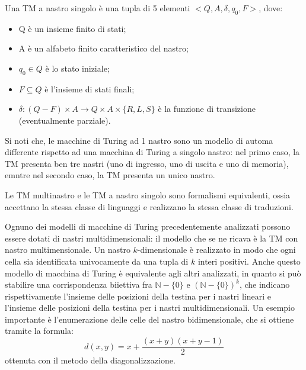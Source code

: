   \begin{definition}
    Una TM a nastro singolo è una tupla di 5 elementi \(<Q,A,\delta, q_0, F>\), dove:
    \begin{itemize}
      \item Q è un insieme finito di stati;
      \item A è un alfabeto finito caratteristico del nastro;
      \item \(q_0 \in Q\) è lo stato iniziale;
      \item \(F\subseteq Q\) è l'insieme di stati finali;
      \item \(\delta:(Q-F)\times A \to Q\times A\times \{R,L,S\}\) è la funzione di transizione (eventualmente parziale).
    \end{itemize}
  \end{definition}

  Si noti che, le macchine di Turing ad 1 nastro sono un modello di automa differente rispetto ad una macchina di Turing a singolo nastro: nel primo caso, la TM presenta ben tre nastri (uno di ingresso, uno di uscita e uno di memoria), emntre nel secondo caso, la TM presenta un unico nastro. 

  \begin{theorem}
    Le TM multinastro e le TM a nastro singolo sono formalismi equivalenti, ossia accettano la stessa classe di linguaggi e realizzano la stessa classe di traduzioni.
  \end{theorem}


  Ognuno dei modelli di macchine di Turing precedentemente analizzati possono essere dotati di nastri multidimensionali: il modello che se ne ricava è la TM con nastro multimensionale. Un nastro \(k\)-dimensionale è realizzato in modo che ogni cella sia identificata univocamente da una tupla di \(k\) interi positivi. Anche questo modello di macchina di Turing è equivalente agli altri analizzati, in quanto si può stabilire una corrispondenza biiettiva fra \(\mathbb N - \{0\}\) e \((\mathbb N - \{0\})^k\), che indicano rispettivamente l'insieme delle posizioni della testina per i nastri lineari e l'insieme delle posizioni della testina per i nastri multidimensionali. Un esempio importante è l'enumerazione delle celle del nastro bidimensionale, che si ottiene tramite la formula:
  \begin{equation*}
    \displaystyle d(x,y) = x+\frac{(x+y)(x+y-1)}{2}
  \end{equation*}
  ottenuta con il metodo della diagonalizzazione. 